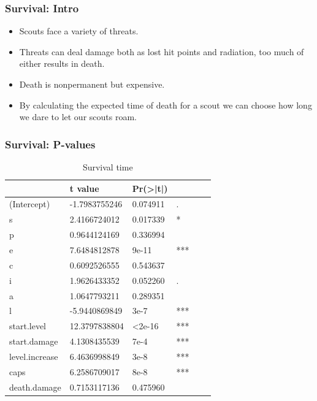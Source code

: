 \documentclass{beamer}
\begin{document}
\begin{frame}
  \frametitle{Survival: Intro}
  \begin{itemize}
  \item Scouts face a variety of threats.
  \item Threats can deal damage both as lost hit points and radiation, too much of either results in death.
  \item Death is nonpermanent but expensive.
  \item By calculating the expected time of death for a scout we can choose how long we dare to let our scouts roam.
  \end{itemize}
\end{frame}


\begin{frame}
  \frametitle{Survival: P-values}
  \begin{table}[]
    \centering
    \caption{Survival time}
    \label{table:survival.time}
    \begin{tabular}{l|lllll}
      &t value&Pr(>|t|)& \\ 
      \hline
      (Intercept)    &  -1.7983755246 & 0.074911&. \\ 
      s              &  2.4166724012  & 0.017339 &*\\
      p              &  0.9644124169  & 0.336994 &\\
      e              &  7.6484812878  & 9e-11&*** \\
      c              &  0.6092526555  & 0.543637& \\
      i              &  1.9626433352  & 0.052260& .\\
      a              &  1.0647793211  & 0.289351& \\
      l              &  -5.9440869849 & 3e-7&*** \\
      start.level    &  12.3797838804 & <2e-16&*** \\
      start.damage   &  4.1308435539  & 7e-4&*** \\
      level.increase &  6.4636998849  & 3e-8 &***\\
      caps           &  6.2586709017  & 8e-8&*** \\
      death.damage   &  0.7153117136  & 0.475960&\\
      \hline
    \end{tabular}
  \end{table}
\end{frame}
\end{document}
